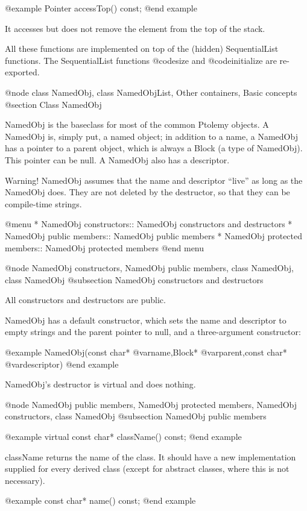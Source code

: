 @example
Pointer accessTop() const;
@end example

It accesses but does not remove the element from the top of the stack.

All these functions are implemented on top of the (hidden)
SequentialList functions.  The SequentialList functions @code{size} and
@code{initialize} are re-exported.

@node class NamedObj, class NamedObjList, Other containers, Basic concepts
@section Class NamedObj

NamedObj is the baseclass for most of the common Ptolemy objects.  A
NamedObj is, simply put, a named object; in addition to a name, a
NamedObj has a pointer to a parent object, which is always a Block (a
type of NamedObj).  This pointer can be null.  A NamedObj also has a
descriptor.

Warning!  NamedObj assumes that the name and descriptor ``live'' as long
as the NamedObj does.  They are not deleted by the destructor, so
that they can be compile-time strings.

@menu
* NamedObj constructors::       NamedObj constructors and destructors
* NamedObj public members::     NamedObj public members
* NamedObj protected members::  NamedObj protected members
@end menu

@node NamedObj constructors, NamedObj public members, class NamedObj, class NamedObj
@subsection NamedObj constructors and destructors

All constructors and destructors are public.

NamedObj has a default constructor, which sets the name and
descriptor to empty strings and the parent pointer to null, and a
three-argument constructor:

@example
NamedObj(const char* @var{name},Block* @var{parent},const char* @var{descriptor})
@end example

NamedObj's destructor is virtual and does nothing.

@node NamedObj public members, NamedObj protected members, NamedObj constructors, class NamedObj
@subsection NamedObj public members

@example
virtual const char* className() const;
@end example

className returns the name of the class.  It should have a new
implementation supplied for every derived class (except for abstract
classes, where this is not necessary).

@example
const char* name() const;
@end example

